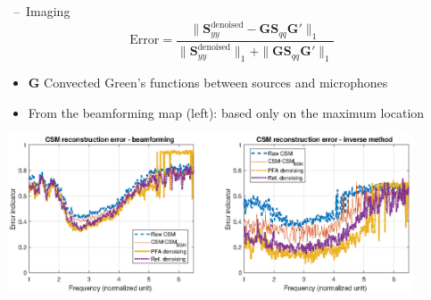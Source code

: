 \documentclass[10pt,xcolor=x11names,compress, show notes]{beamer}%
\begin{document}
\begin{frame}{\insertsectionhead~--~Imaging}
	\centering
	\small
	\begin{equation*}
        		\text{Error} = \frac{\|\bm{S}_{yy}^{\text{denoised}}-\bm{G}\bm{S}_{qq}\bm{G}'\|_1}{\|\bm{S}_{yy}^{\text{denoised}}\|_1+\|\bm{GS}_{qq}\bm{G}'\|_1}
	\end{equation*}
	\begin{itemize}
        		\item $\bm{G}$ Convected Green’s functions between sources and microphones
        		\item From the beamforming map (left): based only on the maximum location
\end{itemize}
	\vfill
	\includegraphics[width=0.9\textwidth]{airbus/erreur.eps}
\end{frame}
\end{document}
